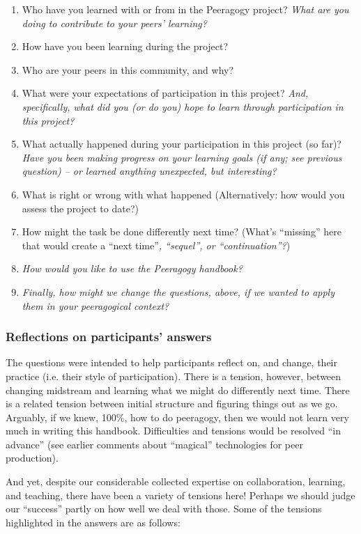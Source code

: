 \begin{enumerate}
\itemsep1pt\parskip0pt
\item
  Who have you learned with or from in the Peeragogy project? \emph{What
  are you doing to contribute to your peers' learning?}
\item
  How have you been learning during the project?
\item
  Who are your peers in this community, and why?
\item
  What were your expectations of participation in this project?
  \emph{And, specifically, what did you (or do you) hope to learn
  through participation in this project?}
\item
  What actually happened during your participation in this project (so
  far)? \emph{Have you been making progress on your learning goals (if
  any; see previous question) -- or learned anything unexpected, but
  interesting?}
\item
  What is right or wrong with what happened (Alternatively: how would
  you assess the project to date?)
\item
  How might the task be done differently next time? (What's ``missing''
  here that would create a ``next time''\emph{, ``sequel'', or
  ``continuation''?})
\item
  \emph{How would you like to use the Peeragogy handbook?}
\item
  \emph{Finally, how might we change the questions, above, if we wanted
  to apply them in your peeragogical context?}
\end{enumerate}

\subsubsection{\textbf{Reflections on participants' answers}}

The questions were intended to help participants reflect on, and change,
their practice (i.e. their style of participation). There is a tension,
however, between changing midstream and learning what we might do
differently next time. There is a related tension between initial
structure and figuring things out as we go. Arguably, if we knew, 100\%,
how to do peeragogy, then we would not learn very much in writing this
handbook. Difficulties and tensions would be resolved ``in advance''
(see earlier comments about ``magical'' technologies for peer
production).

And yet, despite our considerable collected expertise on collaboration,
learning, and teaching, there have been a variety of tensions here!
Perhaps we should judge our ``success'' partly on how well we deal with
those. Some of the tensions highlighted in the answers are as follows:

